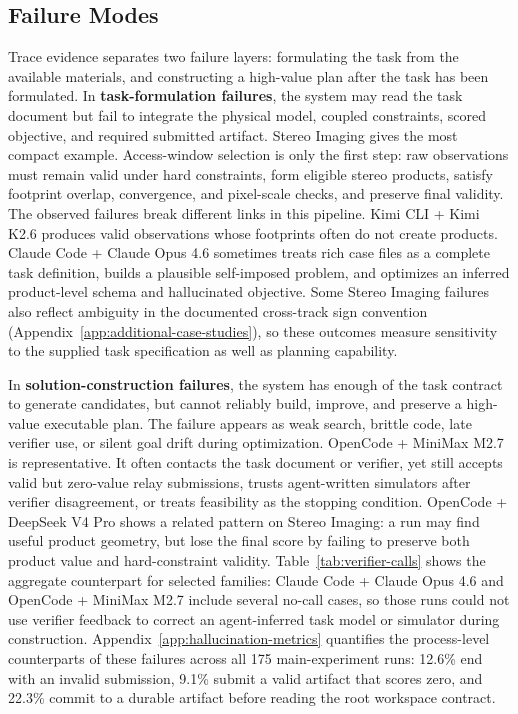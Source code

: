 \documentclass[]{mosi}
\begin{document}
\subsection{Failure Modes}
\label{sec:what-fails}

Trace evidence separates two failure layers: formulating the task from the available materials, and constructing a high-value plan after the task has been formulated. In \textbf{task-formulation failures}, the system may read the task document but fail to integrate the physical model, coupled constraints, scored objective, and required submitted artifact. Stereo Imaging gives the most compact example. Access-window selection is only the first step: raw observations must remain valid under hard constraints, form eligible stereo products, satisfy footprint overlap, convergence, and pixel-scale checks, and preserve final validity. The observed failures break different links in this pipeline. Kimi CLI + Kimi K2.6 produces valid observations whose footprints often do not create products. Claude Code + Claude Opus 4.6 sometimes treats rich case files as a complete task definition, builds a plausible self-imposed problem, and optimizes an inferred product-level schema and hallucinated objective. Some Stereo Imaging failures also reflect ambiguity in the documented cross-track sign convention (Appendix~\ref{app:additional-case-studies}), so these outcomes measure sensitivity to the supplied task specification as well as planning capability.

In \textbf{solution-construction failures}, the system has enough of the task contract to generate candidates, but cannot reliably build, improve, and preserve a high-value executable plan. The failure appears as weak search, brittle code, late verifier use, or silent goal drift during optimization. OpenCode + MiniMax M2.7 is representative. It often contacts the task document or verifier, yet still accepts valid but zero-value relay submissions, trusts agent-written simulators after verifier disagreement, or treats feasibility as the stopping condition. OpenCode + DeepSeek V4 Pro shows a related pattern on Stereo Imaging: a run may find useful product geometry, but lose the final score by failing to preserve both product value and hard-constraint validity. Table~\ref{tab:verifier-calls} shows the aggregate counterpart for selected families: Claude Code + Claude Opus 4.6 and OpenCode + MiniMax M2.7 include several no-call cases, so those runs could not use verifier feedback to correct an agent-inferred task model or simulator during construction. Appendix~\ref{app:hallucination-metrics} quantifies the process-level counterparts of these failures across all 175 main-experiment runs: 12.6\% end with an invalid submission, 9.1\% submit a valid artifact that scores zero, and 22.3\% commit to a durable artifact before reading the root workspace contract.
\end{document}
